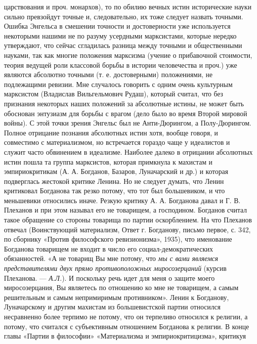 царствования и проч. монархов), то по обилию вечных истин исторические
науки  сильно  превзойдут точные  и,  следовательно,  их тоже  следует
назвать точными.  Ошибка Энгельса в смешении  точности и достоверности
уже используется некоторыми нашими не по разуму усердными марксистами,
которые  нередко  утверждают,  что  сейчас  сгладилась  разница  между
точными и  общественными науками,  так как многие  положения марксизма
(учение о прибавочной стоимости,  теория ведущей роли классовой борьбы
в истории человечества и проч.)  уже являются абсолютно точными (т. е.
достоверными)  положениями,  не  подлежащими  ревизии.  Мне  случалось
говорить с одним очень  культурным марксистом (Владислав Вильгельмович
Рудаш), который считал, что без признания некоторых наших положений за
абсолютные  истины, не  может быть  обоснован энтузиазм  для борьбы  с
врагом (дело было во время Второй  мировой войны). С этой точки зрения
Энгельс  был  не  Анти-Дюрингом,  а  Полу-Дюрингом.  Полное  отрицание
познания  абсолютных  истин  хотя,   вообще  говоря,  и  совместимо  с
материализмом,  но  встречается гораздо  чаще  у  идеалистов и  служит
часто обвинением  в идеализме. Наиболее далеко  в отрицании абсолютных
истин  пошла та  группа  марксистов, которая  примкнула  к махистам  и
эмпириокритикам (А. А. Богданов, Базаров, Луначарский и др.) и которая
подверглась жестокой критике  Ленина. Но не следует  думать, что Ленин
критиковал Богданова так резко потому,  что тот был большевиком, и что
меньшевики относились иначе. Резкую критику А. А. Богданова давал и Г.
В.  Плеханов  и при  этом  называл  его  не товарищем,  а  господином.
Богданов  считал  такое  обращение   со  стороны  товарища  по  партии
оскорблением. На что Плеханов отвечал (Воинствующий материализм, Ответ
г. Богданову, письмо первое, с.  342, по сборнику «Против философского
ревизионизма», 1935),  что именование Богданова товарищем  не входит в
число его  социал-демократических обязанностей.  «А не товарищ  Вы мне
потому,  что  \emph{мы  с  вами являемся  представителями  двух  прямо
противоположных миросозерцаний} (курсив Плеханова. --- \emph{А.Л.}). И
поскольку  речь  идет  для  меня о  защите  моего  миросозерцания,  Вы
являетесь  по отношению  ко мне  не товарищем,  а самым  решительным и
самым  непримиримым противником».  Ленин к  Богданову, Луначарскому  и
другим махистам  из большевистской партии относился  несравненно более
терпимо не потому, что он терпеливо относился к религии, а потому, что
считался с субъективным отношением Богданова  к религии. В конце главы
«Партии  в  философии»  «Материализма и  эмпириокритицизма»,  критикуя
